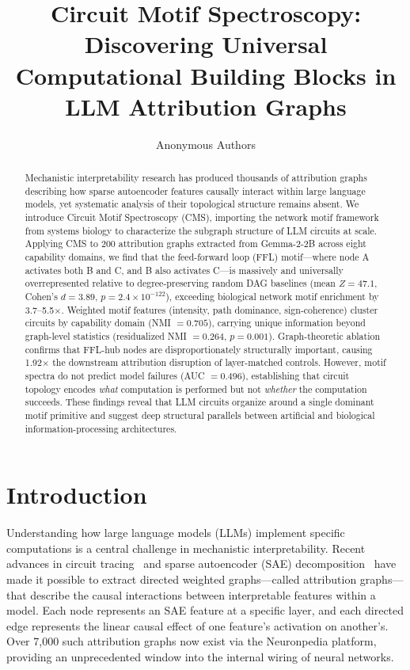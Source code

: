 \documentclass[11pt,letterpaper]{article}
\title{Circuit Motif Spectroscopy: Discovering Universal Computational Building Blocks in LLM Attribution Graphs}
\author{
  Anonymous Authors
}
\date{}
\begin{document}
\maketitle

\begin{abstract}
Mechanistic interpretability research has produced thousands of attribution graphs describing how sparse autoencoder features causally interact within large language models, yet systematic analysis of their topological structure remains absent. We introduce Circuit Motif Spectroscopy (CMS), importing the network motif framework from systems biology to characterize the subgraph structure of LLM circuits at scale. Applying CMS to 200 attribution graphs extracted from Gemma-2-2B across eight capability domains, we find that the feed-forward loop (FFL) motif---where node A activates both B and C, and B also activates C---is massively and universally overrepresented relative to degree-preserving random DAG baselines (mean $Z = 47.1$, Cohen's $d = 3.89$, $p = 2.4 \times 10^{-122}$), exceeding biological network motif enrichment by 3.7--5.5$\times$. Weighted motif features (intensity, path dominance, sign-coherence) cluster circuits by capability domain (NMI $= 0.705$), carrying unique information beyond graph-level statistics (residualized NMI $= 0.264$, $p = 0.001$). Graph-theoretic ablation confirms that FFL-hub nodes are disproportionately structurally important, causing 1.92$\times$ the downstream attribution disruption of layer-matched controls. However, motif spectra do not predict model failures (AUC $= 0.496$), establishing that circuit topology encodes \emph{what} computation is performed but not \emph{whether} the computation succeeds. These findings reveal that LLM circuits organize around a single dominant motif primitive and suggest deep structural parallels between artificial and biological information-processing architectures.
\end{abstract}

\section{Introduction}
\label{sec:intro}

Understanding how large language models (LLMs) implement specific computations is a central challenge in mechanistic interpretability. Recent advances in circuit tracing~\citep{Anthropic2025} and sparse autoencoder (SAE) decomposition~\citep{Bricken2023, Cunningham2024, Templeton2024} have made it possible to extract directed weighted graphs---called attribution graphs---that describe the causal interactions between interpretable features within a model. Each node represents an SAE feature at a specific layer, and each directed edge represents the linear causal effect of one feature's activation on another's. Over 7,000 such attribution graphs now exist via the Neuronpedia platform, providing an unprecedented window into the internal wiring of neural networks.
\end{document}

